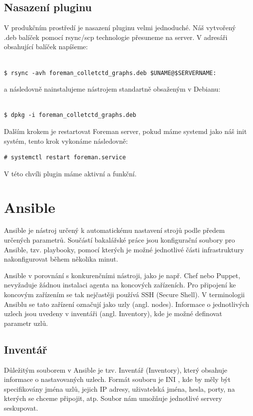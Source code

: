 \documentclass[thesis=B,czech]{FITthesis}[2012/06/26]
\begin{document}
\subsection{Nasazení pluginu}

V produkčním prostředí je nasazení pluginu velmi jednoduché. Náš vytvořený .deb balíček pomocí rsync/scp technologie přesuneme na server. V adresáři obsahující balíček napíšeme:
\begin{verbatim}

$ rsync -avh foreman_colletctd_graphs.deb $UNAME@$SERVERNAME:
\end{verbatim}

a následovně nainstalujeme nástrojem standartně obsaženým v Debianu:
\begin{verbatim}

$ dpkg -i foreman_colletctd_graphs.deb
\end{verbatim}

Dalším krokem je restartovat Foreman server, pokud máme systemd jako náš init systém, tento krok vykonáme následovně:
\begin{verbatim}
# systemctl restart foreman.service
\end{verbatim}

V této chvíli plugin máme aktivní a funkční.

\section{Ansible}

Ansible je nástroj určený k automatickému nastavení strojů podle předem určených parametrů. Součástí bakalářské práce jsou konfigurační soubory pro Ansible, tzv. playbooky, pomocí kterých je možné jednotlivé části infrastruktury nakonfigurovat během několika minut. 

Ansible v porovnání s konkurenčními nástroji, jako je např. Chef nebo Puppet, nevyžaduje žádnou instalaci agenta na koncových zařízeních. Pro připojení ke koncovým
zařízením  se tak nejčastěji používá SSH (Secure Shell). V terminologii Ansiblu se tato zařízení označují jako uzly (angl. nodes). Informace o jednotlivých uzlech jsou uvedeny v inventáři (angl. Inventory), kde je možné definovat parametr uzlů.


\subsection{Inventář}

Důležitým souborem v Ansible je tzv. Inventář (Inventory), který obsahuje informace o nastavovaných uzlech. Formát souboru je INI \cite{ini-fmt}, kde by měly být specifikovány jména uzlů, jejich IP adresy, uživatelská jména, hesla, porty, na kterých se chceme připojit, atp. Soubor nám umožňuje jednotlivé servery seskupovat. 
\end{document}
